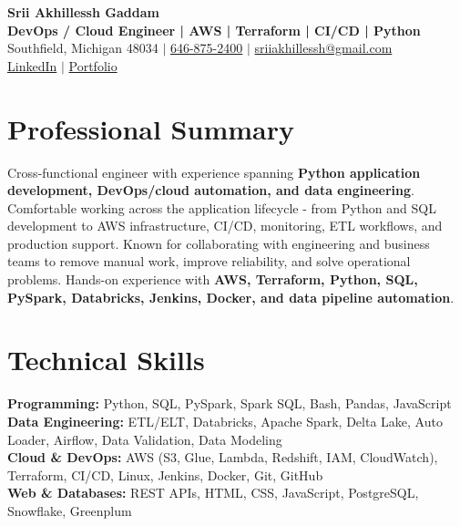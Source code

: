 \documentclass[letterpaper,10pt]{article}
\begin{document}
\fontsize{9.35pt}{10.45pt}\selectfont

\begin{center}
    {\LARGE \textbf{Srii Akhillessh Gaddam}} \\[-1pt]
    \textbf{DevOps / Cloud Engineer | AWS | Terraform | CI/CD | Python} \\[2pt]
    Southfield, Michigan 48034 $|$
    \href{tel:6468752400}{646-875-2400} $|$
    \href{mailto:sriiakhillessh@gmail.com}{sriiakhillessh@gmail.com} \\[1pt]
    \href{https://www.linkedin.com/in/srii-akhiilessh-gaddam-b48668191/}{LinkedIn} $|$
    \href{https://sriiakhillesshg.github.io/portfolio/}{Portfolio}
\end{center}
\vspace{-8pt}

\section{Professional Summary}
\small{Cross-functional engineer with experience spanning \textbf{Python application development, DevOps/cloud automation, and data engineering}. Comfortable working across the application lifecycle - from Python and SQL development to AWS infrastructure, CI/CD, monitoring, ETL workflows, and production support. Known for collaborating with engineering and business teams to remove manual work, improve reliability, and solve operational problems. Hands-on experience with \textbf{AWS, Terraform, Python, SQL, PySpark, Databricks, Jenkins, Docker, and data pipeline automation}.}

\section{Technical Skills}
\small{
\textbf{Programming:} Python, SQL, PySpark, Spark SQL, Bash, Pandas, JavaScript \\
\textbf{Data Engineering:} ETL/ELT, Databricks, Apache Spark, Delta Lake, Auto Loader, Airflow, Data Validation, Data Modeling \\
\textbf{Cloud \& DevOps:} AWS (S3, Glue, Lambda, Redshift, IAM, CloudWatch), Terraform, CI/CD, Linux, Jenkins, Docker, Git, GitHub \\
\textbf{Web \& Databases:} REST APIs, HTML, CSS, JavaScript, PostgreSQL, Snowflake, Greenplum
}
\end{document}

